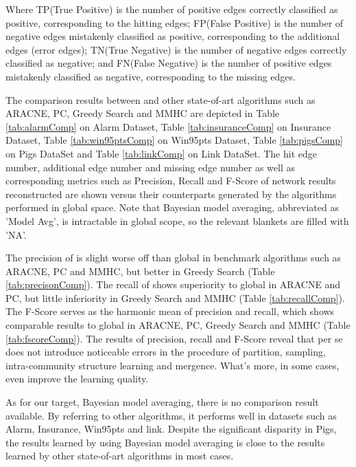 Where TP(True Positive) is the number of positive edges correctly classified as positive, corresponding to the hitting edges; FP(False Positive) is the number of negative edges mistakenly classified as positive, corresponding to the additional edges (error edges); TN(True Negative) is the number of negative edges correctly classified as negative; and FN(False Negative) is the number of positive edges mistakenly classified as negative, corresponding to the missing edges.

The comparison results between \lama{} and other state-of-art algorithms such as ARACNE, PC, Greedy Search and MMHC are depicted in Table \ref{tab:alarmComp} on Alarm Dataset, Table \ref{tab:insuranceComp} on Insurance Dataset, Table \ref{tab:win95ptsComp} on Win95pts Dataset, Table \ref{tab:pigsComp} on Pigs DataSet and Table \ref{tab:linkComp} on Link DataSet. The hit edge number, additional edge number and missing edge number as well as corresponding metrics such as Precision, Recall and F-Score of network results reconstructed \lama{} are shown versus their counterparts generated by the algorithms performed in global space. Note that Bayesian model averaging, abbreviated as 'Model Avg', is intractable in global scope, so the relevant blankets are filled with 'NA'.


The precision of \lama{} is slight worse off than global in benchmark
algorithms such as ARACNE, PC and MMHC, but better in Greedy Search
(Table \ref{tab:precisonComp}). The recall of \lama{} shows superiority to global in ARACNE and PC, but little inferiority in Greedy Search and MMHC (Table \ref{tab:recallComp}). The F-Score serves as the harmonic mean of precision and recall, which shows comparable results to global in ARACNE, PC, Greedy Search and MMHC (Table \ref{tab:fscoreComp}). The results of precision, recall and F-Score reveal that \lama{} per se does not introduce noticeable errors in the procedure of partition, sampling, intra-community structure learning and mergence. What's more, in some cases, \lama{} even improve the learning quality.

As for our target, Bayesian model averaging, there is no comparison result available. By referring to other algorithms, it performs well in datasets such as Alarm, Insurance, Win95pts and link. Despite the significant disparity in Pigs, the results learned by using Bayesian model averaging is close to the results learned by other state-of-art algorithms in most cases.

